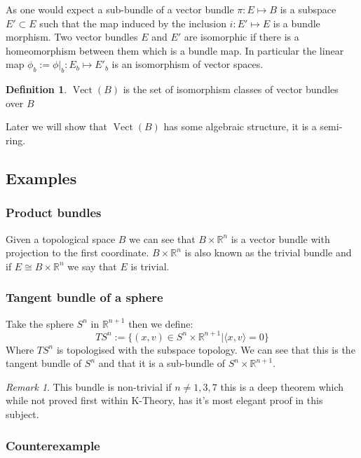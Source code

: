 \documentclass[a4paper,10pt]{article}
\theoremstyle{plain}%
\theoremstyle{definition}
\newtheorem{defn}{Definition}
\theoremstyle{remark}
\newtheorem{rem}{Remark}
\newcommand{\RR}{\mathbb{R}}
\DeclareMathOperator{\Vect}{Vect}
\begin{document}
As one would expect a sub-bundle of a vector bundle $\pi:E\mapsto B$ is a subspace $E'\subset E$
such that the map induced by the inclusion $i:E'\mapsto E$ is a bundle morphism. Two 
vector bundles $E$ and $E'$ are isomorphic if there is a homeomorphism between them which is a bundle map.
In particular the linear map $\phi_b:=\phi|_b :E_b \mapsto E'_b$ is an isomorphism of vector spaces.

\begin{defn}
  $\Vect(B)$ is the set of isomorphism classes of vector bundles over $B$
\end{defn}

Later we will show that $\Vect(B)$ has some algebraic structure, it is a semi-ring.

\subsection{Examples}

\subsubsection{Product bundles}

Given a topological space $B$ we can see that $B\times \RR^n$ is a vector bundle with projection to
the first coordinate. $B \times\RR^n$ is also known as the trivial bundle and if $E\cong B\times \RR^n$ 
we say that $E$ is trivial.

\subsubsection{Tangent bundle of a sphere}

Take the sphere $S^n$ in $\RR^{n+1}$ then we define:
$$TS^n:=\{(x,v) \in S^n\times \RR^{n+1} | \langle x,v \rangle =0\} $$
Where $TS^n$ is topologised with the subspace topology.
We can see that this is the tangent bundle of $S^n$ and that it is a sub-bundle of $S^n\times \RR^{n+1}$.

\begin{rem}
 This bundle is non-trivial if $n\neq 1,3,7$ this is a deep theorem which while not proved first within 
K-Theory, has it's most elegant proof in this subject.
\end{rem}


\subsubsection{Counterexample}
\end{document}
